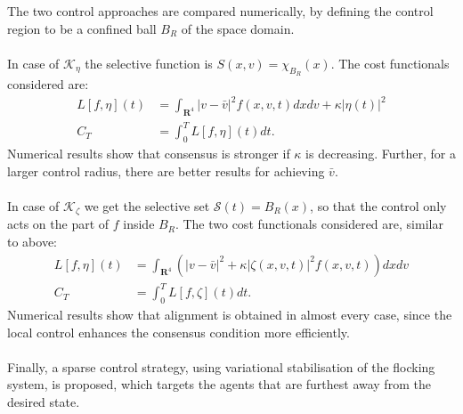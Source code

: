 \documentclass[11pt, a4paper]{article}
\theoremstyle{definition}
\begin{document}
The two control approaches are compared numerically, by defining the control region to be a confined ball $B_R$ of the space domain.\\
\\
In case of $\mathcal{K}_\eta$ the selective function is $S(x,v)= \chi_{B_R}(x)$. The cost functionals considered are:
\begin{align*}
L[f,\eta](t) &= \int_{\mathbf{R}^{4}} |v- \bar v|^2 f(x,v,t) dxdv + \kappa |\eta(t)|^2\\
C_T &= \int_0^T L[f,\eta](t) dt.
\end{align*}
Numerical results show that consensus is stronger if $\kappa$ is decreasing. Further, for a larger control radius, there are better results for achieving $\bar v$.\\
\\
In case of $\mathcal{K}_\zeta$ we get the selective set $\mathcal{S}(t)=B_R(x)$, so that the control only acts on the part of $f$ inside $B_R$. The two cost functionals considered are, similar to above:
\begin{align*}
L[f,\eta](t) &= \int_{\mathbf{R}^{4}} (|v- \bar v|^2 + \kappa |\zeta(x,v,t)|^2 f(x,v,t)) dxdv  \\
C_T &= \int_0^T L[f,\zeta](t) dt.
\end{align*}
Numerical results show that alignment is obtained in almost every case, since the local control enhances the consensus condition more efficiently.\\
\\
Finally, a sparse control strategy, using variational stabilisation of the flocking system, is proposed, which targets the agents that are furthest away from the desired state.
\end{document}
